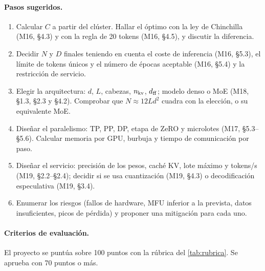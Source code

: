 \paragraph{Pasos sugeridos.}
\begin{enumerate}[label=\arabic*.]
  \item Calcular $C$ a partir del clúster. Hallar el óptimo con la ley de Chinchilla (M16, §4.3) y con la regla de 20 tokens (M16, §4.5), y discutir la diferencia.
  \item Decidir $N$ y $D$ finales teniendo en cuenta el coste de inferencia (M16, §5.3), el límite de tokens únicos y el número de épocas aceptable (M16, §5.4) y la restricción de servicio.
  \item Elegir la arquitectura: $d$, $L$, cabezas, $n_{\mathrm{kv}}$, $d_{\mathrm{ff}}$; modelo denso o MoE (M18, §1.3, §2.3 y §4.2). Comprobar que $N\approx 12Ld^{2}$ cuadra con la elección, o su equivalente MoE.
  \item Diseñar el paralelismo: TP, PP, DP, etapa de ZeRO y microlotes (M17, §5.3--§5.6). Calcular memoria por GPU, burbuja y tiempo de comunicación por paso.
  \item Diseñar el servicio: precisión de los pesos, caché KV, lote máximo y tokens/s (M19, §2.2--§2.4); decidir si se usa cuantización (M19, §4.3) o decodificación especulativa (M19, §3.4).
  \item Enumerar los riesgos (fallos de hardware, MFU inferior a la prevista, datos insuficientes, picos de pérdida) y proponer una mitigación para cada uno.
\end{enumerate}

\paragraph{Criterios de evaluación.} El proyecto se puntúa sobre 100 puntos con la rúbrica del \cref{tab:rubrica}. Se aprueba con 70 puntos o más.


